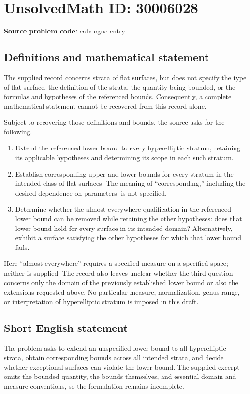 \documentclass[11pt]{article}
\begin{document}
\section*{UnsolvedMath ID: 30006028}
\textbf{Source problem code:} catalogue entry
\subsection{Definitions and mathematical statement}
The supplied record concerns strata of flat surfaces, but does not specify the type of flat surface, the definition of the strata, the quantity being bounded, or the formulas and hypotheses of the referenced bounds. Consequently, a complete mathematical statement cannot be recovered from this record alone.

Subject to recovering those definitions and bounds, the source asks for the following.
\begin{enumerate}
\item Extend the referenced lower bound to every hyperelliptic stratum, retaining its applicable hypotheses and determining its scope in each such stratum.
\item Establish corresponding upper and lower bounds for every stratum in the intended class of flat surfaces. The meaning of ``corresponding,'' including the desired dependence on parameters, is not specified.
\item Determine whether the almost-everywhere qualification in the referenced lower bound can be removed while retaining the other hypotheses: does that lower bound hold for every surface in its intended domain? Alternatively, exhibit a surface satisfying the other hypotheses for which that lower bound fails.
\end{enumerate}
Here ``almost everywhere'' requires a specified measure on a specified space; neither is supplied. The record also leaves unclear whether the third question concerns only the domain of the previously established lower bound or also the extensions requested above. No particular measure, normalization, genus range, or interpretation of hyperelliptic stratum is imposed in this draft.
\subsection{Short English statement}
The problem asks to extend an unspecified lower bound to all hyperelliptic strata, obtain corresponding bounds across all intended strata, and decide whether exceptional surfaces can violate the lower bound. The supplied excerpt omits the bounded quantity, the bounds themselves, and essential domain and measure conventions, so the formulation remains incomplete.
\end{document}
